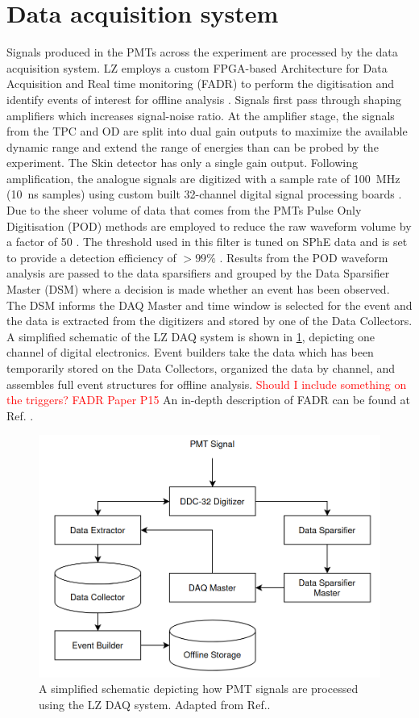 \section{Data acquisition system}\label{sec:LZ/LZDAQ}
Signals produced in the PMTs across the experiment are processed by the data acquisition system. LZ employs a custom FPGA-based Architecture for Data Acquisition and Real time monitoring (FADR) to perform the digitisation and identify events of interest for offline analysis \cite{LZ:2024bvw,Druszkiewicz:2015pcl}. 
Signals first pass through shaping amplifiers which increases signal-noise ratio. At the amplifier stage, the signals from the TPC and OD are split into dual gain outputs to maximize the available dynamic range and extend the range of energies than can be probed by the experiment. The Skin detector has only a single gain output. Following amplification, the analogue signals are digitized with a sample rate of 100~MHz (10~ns samples) using custom built 32-channel digital signal processing boards \cite{Druszkiewicz:2015pcl}. Due to the sheer volume of data that comes from the PMTs Pulse Only Digitisation (POD) methods are employed to reduce the raw waveform volume by a factor of 50 \cite{LZTDR}. The threshold used in this filter is tuned on SPhE data and is set to provide a detection efficiency of $>99\%$ \cite{LZ:2024bvw}. Results from the POD waveform analysis are passed to the data sparsifiers and grouped by the Data Sparsifier Master (DSM) where a decision is made whether an event has been observed. The DSM informs the DAQ Master and time window is selected for the event and the data is extracted from the digitizers and stored by one of the Data Collectors. A simplified schematic of the LZ DAQ system is shown in \ref{fig:LZDAQ}, depicting one channel of digital electronics. Event builders take the data which has been temporarily stored on the Data Collectors, organized the data by channel, and assembles full event structures for offline analysis. \textcolor{red}{Should I include something on the triggers? FADR Paper P15 \cite{LZ:2024bvw}} An in-depth description of FADR can be found at Ref. \cite{LZ:2024bvw}.
\begin{figure}[h!]
    \centering
    \includegraphics[width=\linewidth]{figures/LZ/LZDAQ.png}
    \caption{A simplified schematic depicting how PMT signals are processed using the LZ DAQ system. Adapted from Ref.\cite{LZ:2024bvw}.}
    \label{fig:LZDAQ}
\end{figure}
